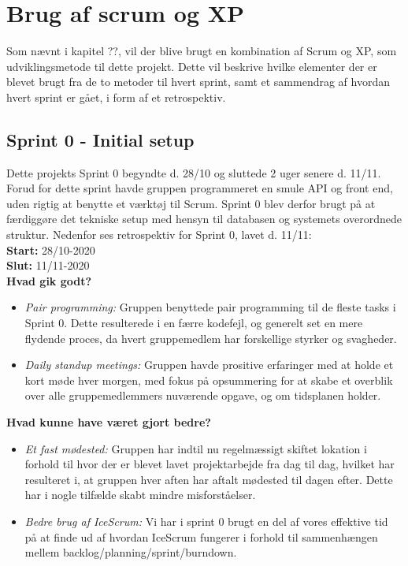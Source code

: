 \section{Brug af scrum og XP}\label{sec:brugafscrum}
Som nævnt i kapitel ??, vil der blive brugt en kombination af Scrum og XP, 
som udviklingsmetode til dette projekt. Dette vil beskrive hvilke elementer der er blevet brugt fra de
to metoder til hvert sprint, samt et sammendrag af hvordan hvert sprint er gået, i form af et retrospektiv.

\subsection{Sprint 0 - Initial setup}
Dette projekts Sprint 0 begyndte d. 28/10 og sluttede 2 uger senere d. 11/11. Forud for dette sprint havde
gruppen programmeret en smule API og front end, uden rigtig at benytte et værktøj til Scrum. Sprint 0
blev derfor brugt på at færdiggøre det tekniske setup med hensyn til databasen og systemets overordnede struktur.
Nedenfor ses retrospektiv for Sprint 0, lavet d. 11/11: \\

\textbf{Start:} 28/10-2020 \\
\textbf{Slut:} 11/11-2020 \\

\textbf{Hvad gik godt?}
\begin{itemize}
    \item \textit{Pair programming:} Gruppen benyttede pair programming til de fleste tasks i Sprint 0. Dette resulterede
    i en færre kodefejl, og generelt set en mere flydende proces, da hvert gruppemedlem har forskellige styrker og svagheder.
    \item \textit{Daily standup meetings:} Gruppen havde prositive erfaringer med at holde et kort møde hver morgen, 
    med fokus på opsummering for at skabe et overblik over alle gruppemedlemmers nuværende opgave, og om tidsplanen holder.
\end{itemize}

\textbf{Hvad kunne have været gjort bedre?}
\begin{itemize}
    \item \textit{Et fast mødested:} Gruppen har indtil nu regelmæssigt skiftet lokation i forhold til hvor der er blevet lavet projektarbejde fra dag til dag, 
    hvilket har resulteret i, at gruppen hver aften har aftalt mødested til dagen efter. Dette har i nogle tilfælde skabt mindre misforståelser.
    \item \textit{Bedre brug af IceScrum:} Vi har i sprint 0 brugt en del af vores effektive tid på at finde ud af hvordan IceScrum fungerer
    i forhold til sammenhængen mellem backlog/planning/sprint/burndown.
\end{itemize}

